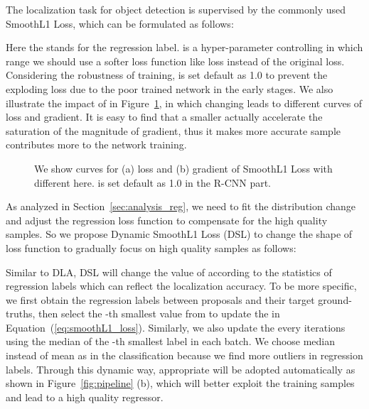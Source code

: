 \documentclass[runningheads]{llncs}
\begin{document}
The localization task for object detection is supervised by the commonly used SmoothL1 Loss, which can be formulated as follows:



Here the  stands for the regression label.  is a hyper-parameter controlling in which range we should use a softer loss function like  loss instead of the original  loss. Considering the robustness of training,  is set default as 1.0 to prevent the exploding loss due to the poor trained network in the early stages. We also illustrate the impact of  in Figure~\ref{fig:smoothL1}, in which changing  leads to different curves of loss and gradient. It is easy to find that a smaller  actually accelerate the saturation of the magnitude of gradient, thus it makes more accurate sample contributes more to the network training.

\begin{figure}[!t]
    \centering
    \caption{We show curves for (a) loss and (b) gradient of SmoothL1 Loss with different  here.  is set default as 1.0 in the R-CNN part.}
    \label{fig:smoothL1}
\end{figure}

As analyzed in Section~\ref{sec:analysis_reg}, we need to fit the distribution change and adjust the regression loss function to compensate for the high quality samples. So we propose Dynamic SmoothL1 Loss (DSL) to change the shape of loss function to gradually focus on high quality samples as follows:



Similar to DLA, DSL will change the value of  according to the statistics of regression labels which can reflect the localization accuracy. To be more specific, we first obtain the regression labels  between proposals and their target ground-truths, then select the -th smallest value from  to update the  in Equation~(\ref{eq:smoothL1_loss}). Similarly, we also update the  every  iterations using the median of the -th smallest label in each batch. We choose median instead of mean as in the classification because we find more outliers in regression labels.
Through this dynamic way, appropriate  will be adopted automatically as shown in Figure~\ref{fig:pipeline} (b), which will better exploit the training samples and lead to a high quality regressor.
\end{document}
